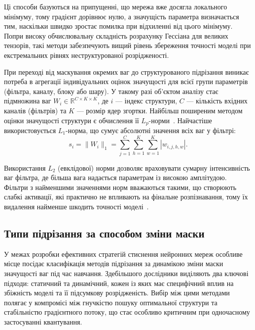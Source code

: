 \documentclass{pma-mthesis}
\begin{document}
Ці способи базуються на припущенні, що мережа вже досягла локального мінімуму, тому градієнт дорівнює нулю, а значущість параметра визначається тим, наскільки швидко зростає помилка при відхиленні від цього мінімуму. Попри високу обчислювальну складність розрахунку Гессіана для великих тензорів, такі методи забезпечують вищий рівень збереження точності моделі при екстремальних рівнях неструктурованої розрідженості.

При переході від маскування окремих ваг до структурованого підрізання виникає потреба в агрегації індивідуальних оцінок значущості для всієї групи параметрів (фільтра, каналу, блоку або шару). У такому разі об’єктом аналізу стає підмножина ваг $W_i \in \mathbb{R}^{C \times K \times K}$, де $i$ --- індекс структури, $C$ --- кількість вхідних каналів (фільтрів) та $K$ --- розмір ядер згортки. Найбільш поширеним методом оцінки значущості структури є обчислення її $L_p$-норми~\cite{molchanov2017pruning}. Найчастіше використовується $L_1$-норма, що сумує абсолютні значення всіх ваг у фільтрі:
\begin{equation}
    s_i = \|W_i\|_1 = \sum_{j=1}^{C} \sum_{h=1}^{K} \sum_{w=1}^{K} |w_{i,j,h,w}|.
\end{equation}

Використання $L_2$ (евклідової) норми дозволяє враховувати сумарну інтенсивність ваг фільтра, де більша вага надається параметрам із високою амплітудою. Фільтри з найменшими значеннями норм вважаються такими, що створюють слабкі активації, які практично не впливають на фінальне розпізнавання, тому їх видалення найменше шкодить точності моделі~\cite{molchanov2017pruning}.

\subsection{Типи підрізання за способом зміни маски}

У межах розробки ефективних стратегій стиснення нейронних мереж особливе місце посідає класифікація методів підрізання за динамікою зміни маски значущості ваг під час навчання. Здебільшого дослідники виділяють два ключові підходи: статичний та динамічний, кожен із яких має специфічний вплив на збіжність моделі та її підсумкову розрідженість. Вибір між цими методами полягає у компромісі між гнучкістю пошуку оптимальної структури та стабільністю градієнтного потоку, що стає особливо критичним при одночасному застосуванні квантування.
\end{document}
